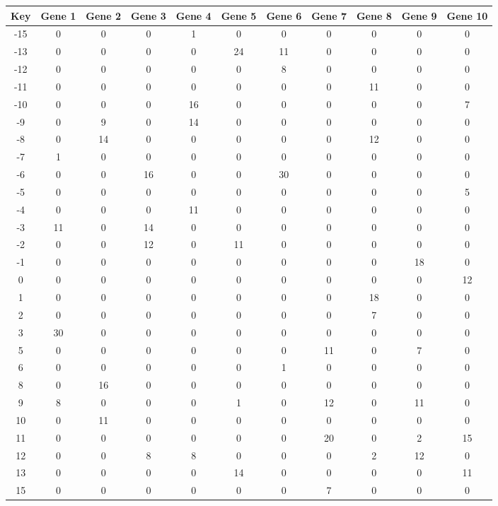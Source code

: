 \begin{tabular}{|c|c|c|c|c|c|c|c|c|c|c|}
\hline
Key & Gene 1 & Gene 2 & Gene 3 & Gene 4 & Gene 5 & Gene 6 & Gene 7 & Gene 8 & Gene 9 & Gene 10 \\
\hline
-15 & 0 & 0 & 0 & 1 & 0 & 0 & 0 & 0 & 0 & 0 \\
-13 & 0 & 0 & 0 & 0 & 24 & 11 & 0 & 0 & 0 & 0 \\
-12 & 0 & 0 & 0 & 0 & 0 & 8 & 0 & 0 & 0 & 0 \\
-11 & 0 & 0 & 0 & 0 & 0 & 0 & 0 & 11 & 0 & 0 \\
-10 & 0 & 0 & 0 & 16 & 0 & 0 & 0 & 0 & 0 & 7 \\
-9 & 0 & 9 & 0 & 14 & 0 & 0 & 0 & 0 & 0 & 0 \\
-8 & 0 & 14 & 0 & 0 & 0 & 0 & 0 & 12 & 0 & 0 \\
-7 & 1 & 0 & 0 & 0 & 0 & 0 & 0 & 0 & 0 & 0 \\
-6 & 0 & 0 & 16 & 0 & 0 & 30 & 0 & 0 & 0 & 0 \\
-5 & 0 & 0 & 0 & 0 & 0 & 0 & 0 & 0 & 0 & 5 \\
-4 & 0 & 0 & 0 & 11 & 0 & 0 & 0 & 0 & 0 & 0 \\
-3 & 11 & 0 & 14 & 0 & 0 & 0 & 0 & 0 & 0 & 0 \\
-2 & 0 & 0 & 12 & 0 & 11 & 0 & 0 & 0 & 0 & 0 \\
-1 & 0 & 0 & 0 & 0 & 0 & 0 & 0 & 0 & 18 & 0 \\
0 & 0 & 0 & 0 & 0 & 0 & 0 & 0 & 0 & 0 & 12 \\
1 & 0 & 0 & 0 & 0 & 0 & 0 & 0 & 18 & 0 & 0 \\
2 & 0 & 0 & 0 & 0 & 0 & 0 & 0 & 7 & 0 & 0 \\
3 & 30 & 0 & 0 & 0 & 0 & 0 & 0 & 0 & 0 & 0 \\
5 & 0 & 0 & 0 & 0 & 0 & 0 & 11 & 0 & 7 & 0 \\
6 & 0 & 0 & 0 & 0 & 0 & 1 & 0 & 0 & 0 & 0 \\
8 & 0 & 16 & 0 & 0 & 0 & 0 & 0 & 0 & 0 & 0 \\
9 & 8 & 0 & 0 & 0 & 1 & 0 & 12 & 0 & 11 & 0 \\
10 & 0 & 11 & 0 & 0 & 0 & 0 & 0 & 0 & 0 & 0 \\
11 & 0 & 0 & 0 & 0 & 0 & 0 & 20 & 0 & 2 & 15 \\
12 & 0 & 0 & 8 & 8 & 0 & 0 & 0 & 2 & 12 & 0 \\
13 & 0 & 0 & 0 & 0 & 14 & 0 & 0 & 0 & 0 & 11 \\
15 & 0 & 0 & 0 & 0 & 0 & 0 & 7 & 0 & 0 & 0 \\
\hline
\end{tabular}